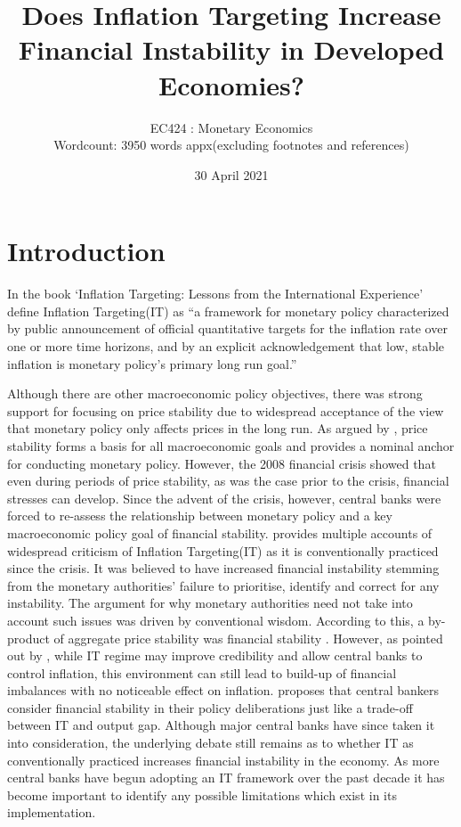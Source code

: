 \documentclass[12pt]{article}
\title{Does Inflation Targeting Increase Financial Instability in Developed Economies?}
\author{\normalsize EC424 : Monetary Economics  \\ \scriptsize Wordcount: 3950 words appx(excluding footnotes and references)}
\date{30 April 2021}
\begin{document}
\maketitle

\pagebreak
\tableofcontents
\pagebreak
\section{Introduction}

In the book `Inflation Targeting: Lessons from the International Experience' \cite{RN1} define Inflation Targeting(IT) as ``a framework for monetary policy characterized by public announcement of official quantitative targets for the inflation rate over one or more time horizons, and by an explicit acknowledgement that low,  stable inflation is monetary policy's primary long run goal.''

Although there are other macroeconomic policy objectives, there was strong support for focusing on price stability due to widespread acceptance of the view that monetary policy only affects prices in the long run\citep{RN32}. As argued by \cite{RN1}, price stability forms a basis for all macroeconomic goals and provides a nominal anchor for conducting monetary policy.  However, the 2008 financial crisis showed that even during periods of price stability, as was the case prior to the crisis, financial stresses can develop. Since the advent of the crisis, however, central banks were forced to re-assess the relationship between monetary policy and a key macroeconomic policy goal of financial stability.  \cite{RN11} provides multiple accounts of widespread criticism of Inflation Targeting(IT) as it is conventionally practiced since the crisis. It was believed to have increased financial instability stemming from the monetary authorities' failure to prioritise, identify and correct for any instability.  The argument for why monetary authorities need not take into account such issues was driven by conventional wisdom. According to this, a by-product of aggregate price stability was financial stability \citep{RN3}.  However, as pointed out by \cite{RN3}, while IT regime may improve credibility and allow central banks to control inflation, this environment can still lead to build-up of financial imbalances with no noticeable effect on inflation. \cite{RN11} proposes that central bankers consider financial stability in their policy deliberations just like a trade-off between IT and output gap. Although major central banks have since taken it into consideration, the underlying debate still remains as to whether IT as conventionally practiced increases financial instability in the economy. 
As more central banks have begun adopting an IT framework over the past decade it has become important to identify any possible limitations which exist in its implementation. 
\end{document}
